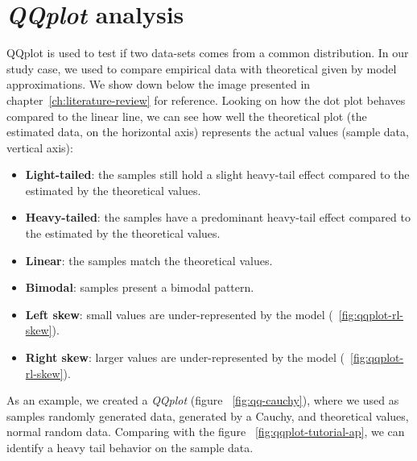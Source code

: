 \section{\textit{QQplot} analysis}

QQplot is used to test if two data-sets comes from a common distribution\cite{web-qqplot}. In our study case, we used to compare empirical data with theoretical given by model approximations. We show down below the image presented in chapter~\ref{ch:literature-review} for reference. 
Looking on how the dot plot behaves compared to the linear line, we can see how well the theoretical plot (the estimated data, on the horizontal axis) represents the actual values (sample data, vertical axis):

\begin{itemize}
\item \textbf{Light-tailed}: the samples still hold a slight heavy-tail effect compared to the estimated by the theoretical values.
\item \textbf{Heavy-tailed}: the samples have a predominant heavy-tail effect compared to the estimated by the theoretical values.
\item \textbf{Linear}: the samples match the theoretical values.
\item \textbf{Bimodal}: samples present a bimodal pattern.
\item \textbf{Left skew}: small values are under-represented by the model (~\ref{fig:qqplot-rl-skew}).
\item \textbf{Right skew}: larger values are under-represented by the model (~\ref{fig:qqplot-rl-skew}).
\end{itemize}



As an example, we created a \textit{QQplot} (figure ~\ref{fig:qq-cauchy}), where we used as samples randomly generated data, generated by a Cauchy, and theoretical values, normal random data. Comparing with the figure ~\ref{fig:qqplot-tutorial-ap}, we can identify a heavy tail behavior on the sample data.




